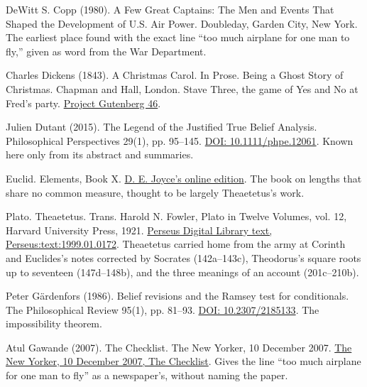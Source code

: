 \documentclass[11pt,twoside]{article}
\theoremstyle{thielethm}
\theoremstyle{thieledef}
\theoremstyle{thieledef}
\theoremstyle{thieledef}
\theoremstyle{thielethm}
\theoremstyle{thieleobs}
\theoremstyle{thielethm}
\begin{document}
\noindent DeWitt S. Copp (1980). A Few Great Captains: The Men and Events That Shaped the Development of U.S. Air Power. Doubleday, Garden City, New York. The earliest place found with the exact line ``too much airplane for one man to fly,'' given as word from the War Department.
\par\medskip

\noindent Charles Dickens (1843). A Christmas Carol. In Prose. Being a Ghost Story of Christmas. Chapman and Hall, London. Stave Three, the game of Yes and No at Fred's party. \href{https://www.gutenberg.org/ebooks/46}{Project Gutenberg 46}.
\par\medskip

\noindent Julien Dutant (2015). The Legend of the Justified True Belief Analysis. Philosophical Perspectives 29(1), pp. 95--145. \href{https://doi.org/10.1111/phpe.12061}{DOI: 10.1111/phpe.12061}. Known here only from its abstract and summaries.
\par\medskip

\noindent Euclid. Elements, Book X. \href{https://mathcs.clarku.edu/~djoyce/elements/bookX/bookX.html}{D. E. Joyce's online edition}. The book on lengths that share no common measure, thought to be largely Theaetetus's work.
\par\medskip

\noindent Plato. Theaetetus. Trans. Harold N. Fowler, Plato in Twelve Volumes, vol. 12, Harvard University Press, 1921. \href{http://www.perseus.tufts.edu/hopper/text?doc=Perseus:text:1999.01.0172}{Perseus Digital Library text, Perseus:text:1999.01.0172}. Theaetetus carried home from the army at Corinth and Euclides's notes corrected by Socrates (142a--143c), Theodorus's square roots up to seventeen (147d--148b), and the three meanings of an account (201c--210b).
\par\medskip

\noindent Peter G\"ardenfors (1986). Belief revisions and the Ramsey test for conditionals. The Philosophical Review 95(1), pp. 81--93. \href{https://doi.org/10.2307/2185133}{DOI: 10.2307/2185133}. The impossibility theorem.
\par\medskip

\noindent Atul Gawande (2007). The Checklist. The New Yorker, 10 December 2007. \href{https://www.newyorker.com/magazine/2007/12/10/the-checklist}{The New Yorker, 10 December 2007, The Checklist}. Gives the line ``too much airplane for one man to fly'' as a newspaper's, without naming the paper.
\par\medskip
\end{document}
